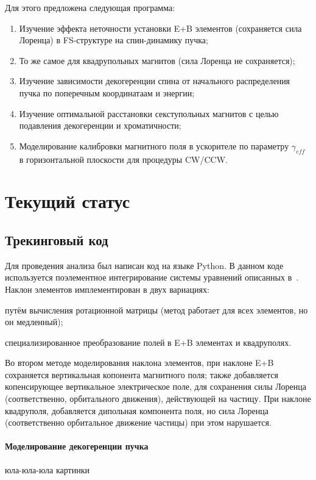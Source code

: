 \documentclass{article}
\begin{document}
	Для этого предложена следующая программа:
	\begin{enumerate}
		\item Изучение эффекта неточности установки E+B элементов (сохраняется сила Лоренца) в FS-структуре на спин-динамику пучка;
		\item То же самое для квадрупольных магнитов (сила Лоренца не сохраняется);
		\item Изучение зависимости декогеренции спина от начального распределения пучка по поперечным координатаам и энергии;
		\item Изучение оптимальной расстановки секступольных магнитов с целью подавления декогеренции и хроматичности;
		\item Моделирование калибровки магнитного поля в ускорителе по параметру $\gamma_{eff}$ в горизонтальной плоскости для процедуры CW/CCW.
	\end{enumerate}

	\section{Текущий статус}
	\subsection{Трекинговый код}
	Для проведения анализа был написан код на языке Python. В данном коде используется поэлементное интегрирование системы уравнений описанных в~\cite[стр. 39]{Ivanov_thesis}. Наклон элементов имплементирован в двух вариациях:
	\begin{inparaenum}[1)]
		\item путём вычисления ротационной матрицы (метод работает для всех элементов, но он медленный);
		\item специализированное преобразование полей в E+B элементах и квадруполях.
	\end{inparaenum}
	Во втором методе моделирования наклона элементов, при наклоне E+B сохраняется вертикальная копонента магнитного поля; также добавляется копенсирующее вертикальное электрическое поле, для сохранения силы Лоренца (соответственно, орбитального движения), действующей на частицу. При наклоне квадруполя, добавляется дипольная компонента поля, но сила Лоренца (соответственно орбитальное движение частицы) при этом нарушается.
	
	\paragraph{Моделирование декогеренции пучка}
	юла-юла-юла 
	картинки
	
\end{document}
